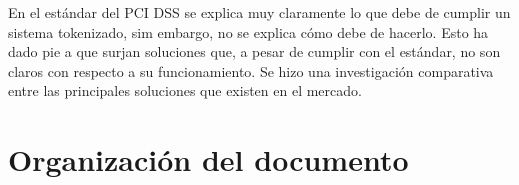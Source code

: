 En el estándar del PCI DSS se explica muy claramente lo que debe de cumplir un
sistema tokenizado, sim embargo, no se explica cómo debe de hacerlo. Esto ha
dado pie a que surjan soluciones que, a pesar de cumplir con el estándar, no
son claros con respecto a su funcionamiento. Se hizo una investigación
comparativa entre las principales soluciones que existen en el mercado.









\section{Organización del documento}


